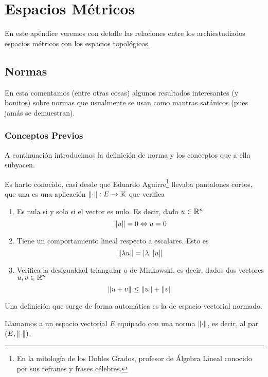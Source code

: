 \chapter{Espacios Métricos}
\label{met}
En este apéndice veremos con detalle las relaciones entre los archiestudiados espacios métricos con los espacios topológicos.
\section{Normas}
En esta comentamos (entre otras cosas) algunos resultados interesantes (y bonitos) sobre normas que usualmente se usan como mantras satánicos (pues jamás se demuestran).
\subsection{Conceptos Previos}
A continuación introducimos la definición de norma y los conceptos que a ella subyacen.
\begin{defi}[Norma]
	Es harto conocido, casi desde que Eduardo Aguirre\footnote{En la mitología de los Dobles Grados, profesor de Álgebra Lineal conocido por sus refranes y frases célebres.} llevaba pantalones cortos, que una  es una aplicación $\lVert\cdot\rVert:E\to\mathbb{K}$ que verifica
	\begin{enumerate}
		\item \label{norma_vector_nulo} Es nula si y solo si el vector es nulo. Es decir, dado $u\in\mathbb{R}^n$
		\begin{equation*}
			\lVert u\rVert=0\Leftrightarrow u=0
		\end{equation*}
		\item \label{norma_lambda} Tiene un comportamiento lineal respecto a escalares. Esto es
		\begin{equation*}
		\lVert\lambda u\rVert=\lvert\lambda\rvert\lVert u\rVert
		\end{equation*}	
		\item \label{norma_triangular} Verifica la desigualdad triangular o de Minkowski, es decir, dados dos vectores $u,v\in\mathbb{R}^n$
		\begin{equation*}
		\lVert u+v\rVert\le \lVert u\rVert+\lVert v\rVert
		\end{equation*}
	\end{enumerate}
\end{defi}
Una definición que surge de forma automática es la de espacio vectorial normado.
\begin{defi}
	Llamamos  a un espacio vectorial $E$ equipado con una norma $\lVert\cdot\rVert$, es decir, al par $(E,\lVert\cdot\rVert)$.
\end{defi}
